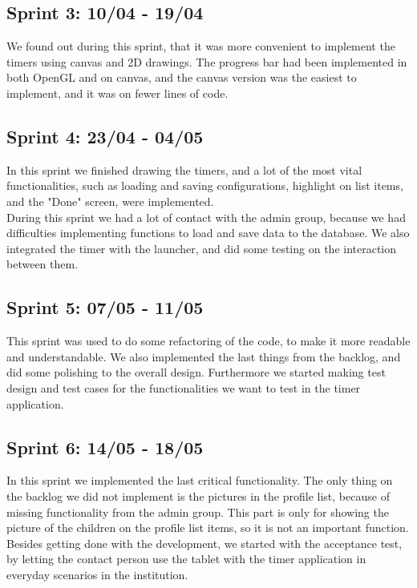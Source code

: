 \subsection*{Sprint 3: 10/04 - 19/04}
We found out during this sprint, that it was more convenient to implement the timers using canvas and 2D drawings. The progress bar had been implemented in both OpenGL and on canvas, and the canvas version was the easiest to implement, and it was on fewer lines of code.	

\subsection*{Sprint 4: 23/04 - 04/05}
In this sprint we finished drawing the timers, and a lot of the most vital functionalities, such as loading and saving configurations, highlight on list items, and the "Done" screen, were implemented.\\
	During this sprint we had a lot of contact with the admin group, because we had difficulties implementing functions to load and save data to the database. We also integrated the timer with the launcher, and did some testing on the interaction between them.

\subsection*{Sprint 5: 07/05 - 11/05} 
This sprint was used to do some refactoring of the code, to make it more readable and understandable. We also implemented the last things from the backlog, and did some polishing to the overall design. Furthermore we started making test design and test cases for the functionalities we want to test in the timer application.

\subsection*{Sprint 6: 14/05 - 18/05}
In this sprint we implemented the last critical functionality. The only thing on the backlog we did not implement is the pictures in the profile list, because of missing functionality from the admin group. This part is only for showing the picture of the children on the profile list items, so it is not an important function.\\
   Besides getting done with the development, we started with the acceptance test, by letting the contact person use the tablet with the timer application in everyday scenarios in the institution.